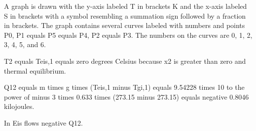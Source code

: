 A graph is drawn with the y-axis labeled T in brackets K and the x-axis labeled S in brackets with a symbol resembling a summation sign followed by a fraction in brackets. The graph contains several curves labeled with numbers and points P0, P1 equals P5 equals P4, P2 equals P3. The numbers on the curves are 0, 1, 2, 3, 4, 5, and 6.

T2 equals Teis,1 equals zero degrees Celsius because x2 is greater than zero and thermal equilibrium.

Q12 equals m times g times (Teis,1 minus Tgi,1) equals 9.54228 times 10 to the power of minus 3 times 0.633 times (273.15 minus 273.15) equals negative 0.8046 kilojoules.

In Eis flows negative Q12.